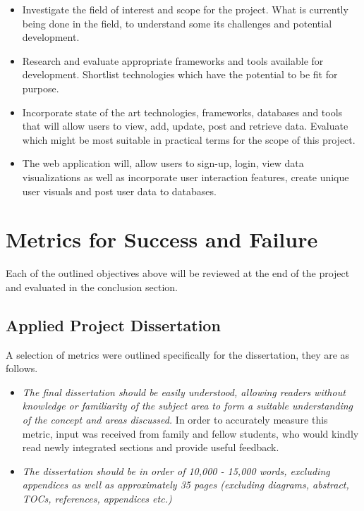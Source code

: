 \begin{itemize}
  \item Investigate the field of interest and scope for the project.
  What is currently being done in the field, to understand some its challenges and potential development.
  
  \item Research and evaluate appropriate frameworks and tools available for development.
  Shortlist technologies which have the potential to be fit for purpose.
  
  \item Incorporate state of the art technologies, frameworks, databases and tools that will allow users to view, add, update, post and retrieve data.
  Evaluate which might be most suitable in practical terms for the scope of this project.
  \item The web application will, allow users to sign-up, login, view data visualizations as well as incorporate user interaction features, create unique user visuals and post user data to databases.
\end{itemize}

\section{Metrics for Success and Failure}
Each of the outlined objectives above will be reviewed at the end of the project and evaluated in the conclusion section.


\vspace{5mm} %

\subsection{Applied Project Dissertation}
A selection of metrics were outlined specifically for the dissertation, they are as follows.

\begin{itemize}

    \item \emph{The final dissertation should be easily understood, allowing readers without knowledge or familiarity of the subject area to form a suitable understanding of the concept and areas discussed.} In order to accurately measure this metric, input was received from family and fellow students, who would kindly read newly integrated sections and provide useful feedback.

    \item \emph{The  dissertation should be in order of 10,000 - 15,000 words, excluding appendices as well as approximately 35 pages (excluding diagrams, abstract, TOCs, references, appendices etc.)}

\end{itemize}


